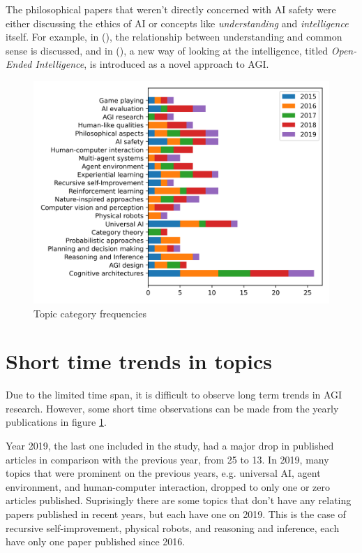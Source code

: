 \documentclass[utf8,english]{gradu3}
\begin{document}
The philosophical papers that weren't directly concerned with AI safety were
either discussing the ethics of AI or concepts like \emph{understanding} and
\emph{intelligence} itself. For example, in (\cite{thorisson2017understanding}),
the relationship between understanding and common sense is discussed, and in
(\cite[]{weinbaum2016Oopenended}), a new way of looking at the intelligence,
titled \emph{Open-Ended Intelligence}, is introduced as a novel approach to AGI.


\begin{figure}[H]
  \centering
  \includegraphics[scale=0.8]{material/data/topic_frequencies_by_year.png}
  \caption{Topic category frequencies}
  \label{fig:topicbar}
\end{figure}

\section{Short time trends in topics}

Due to the limited time span, it is difficult to observe long term trends in AGI
research. However, some short time observations can be made from the yearly
publications in figure \ref{fig:topicbar}. 

Year 2019, the last one included in the study, had a major drop in published
articles in comparison with the previous year, from 25 to 13. In 2019, many
topics that were prominent on the previous years, e.g. universal AI, agent
environment, and human-computer interaction, dropped to only one or zero
articles published. Suprisingly there are some topics that don't have any
relating papers published in recent years, but each have one on 2019. This is
the case of recursive self-improvement, physical robots, and reasoning and
inference, each have only one paper published since 2016.
\end{document}
